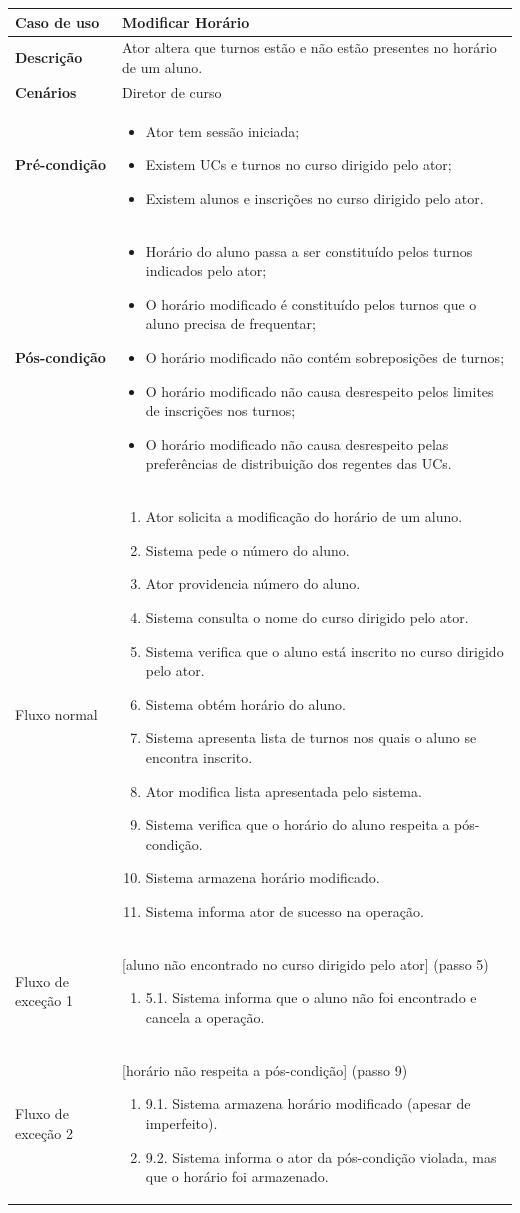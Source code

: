 \documentclass[12pt, a4paper]{article}
\newenvironment{condition}{
    \begin{itemize}[wide=0pt]
        \vspace{-0.2cm}
}{
        \vspace{-0.5cm}
    \end{itemize}
}
\newcommand\flow[1]{
    Fluxo normal &
    \singlespacing
    \begin{enumerate}[wide=0pt]
        #1
        \vspace{-0.3cm}
    \end{enumerate} \\ \hline
}
\newcommand\otherflow[3]{
    #1 &
    #2
    \singlespacing
    \begin{enumerate}[wide=0pt]
        #3
        \vspace{-0.3cm}
    \end{enumerate} \\ \hline
}
\newenvironment{usecase}[5]{
    \begin{table}[H]
        \centering
        \begin{tabular}{|>{\centering\arraybackslash\bf}m{3cm}|m{13cm}|}
            \hline
            Caso de uso & \textbf{#1} \\

            \hline
            Descrição & #2 \\

            \hline
            Cenários & #3 \\

            \hline
            Pré-condição &
            \begin{condition}
                #4
            \end{condition} \\

            \hline
            Pós-condição &
            \begin{condition}
                #5
            \end{condition} \\

            \hline
}{
    \end{tabular}
\end{table}
}
\begin{document}
\begin{usecase}
    {Modificar Horário}
    {Ator altera que turnos estão e não estão presentes no horário de um aluno.}
    {Diretor de curso}
    {
        \item Ator tem sessão iniciada;
        \item Existem UCs e turnos no curso dirigido pelo ator;
        \item Existem alunos e inscrições no curso dirigido pelo ator.
    }
    {
        \item Horário do aluno passa a ser constituído pelos turnos indicados pelo ator;
        \item O horário modificado é constituído pelos turnos que o aluno precisa de frequentar;
        \item O horário modificado não contém sobreposições de turnos;
        \item O horário modificado não causa desrespeito pelos limites de inscrições nos turnos;
        \item O horário modificado não causa desrespeito pelas preferências de distribuição dos
            regentes das UCs.
    }

    \flow{
        \item Ator solicita a modificação do horário de um aluno.
        \item Sistema pede o número do aluno.
        \item Ator providencia número do aluno.
        \item Sistema consulta o nome do curso dirigido pelo ator.
        \item Sistema verifica que o aluno está inscrito no curso dirigido pelo ator.
        \item Sistema obtém horário do aluno.
        \item Sistema apresenta lista de turnos nos quais o aluno se encontra inscrito.
        \item Ator modifica lista apresentada pelo sistema.
        \item Sistema verifica que o horário do aluno respeita a pós-condição.
        \item Sistema armazena horário modificado.
        \item Sistema informa ator de sucesso na operação.
    }

    \otherflow{Fluxo de exceção 1}{[aluno não encontrado no curso dirigido pelo ator] (passo 5)}{
        \item[5.1.] Sistema informa que o aluno não foi encontrado e cancela a operação.
    }

    \otherflow{Fluxo de exceção 2}{[horário não respeita a pós-condição] (passo 9)}{
        \item[9.1.] Sistema armazena horário modificado (apesar de imperfeito).
        \item[9.2.] Sistema informa o ator da pós-condição violada, mas que o horário foi
            armazenado.
    }
\end{usecase}
\end{document}
